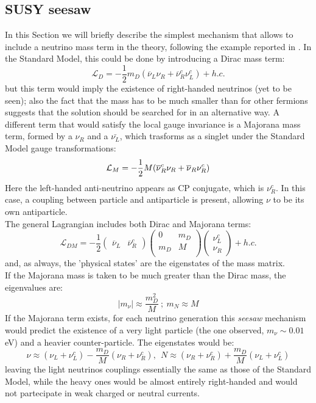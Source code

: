 \documentclass[12pt,a4paper,openright, oneside, titlepage]{book} %
\begin{document}
\subsection{SUSY seesaw}
In this Section we will briefly describe the simplest mechanism 
that allows to include a neutrino mass term in the theory, 
following the example reported in \cite{Thomson}. 
In the Standard Model, 
this could be done by introducing a Dirac mass term:
$$\mathcal{L}_D=-\frac{1}{2}m_D(\overline{\nu}_L\nu_R+\overline{\nu}_R^c\nu_L^c) + h.c.$$
but this term would imply the existence of right-handed neutrinos (yet to be seen); also the fact that the mass has to be much smaller than for other fermions suggests that the solution should be searched for in an alternative way.
A different term that would satisfy the local gauge invariance is a Majorana mass term, 
formed by a $\nu_R$ and a $\bar{\nu_L}$, which trasforms as a singlet under the Standard Model gauge transformations:
$$\mathcal{L}_M=-\frac{1}{2} M(\overline{\nu}\vphantom{\nu}_R^c\nu_R+\overline{\nu}_R\nu_R^c)$$
Here the left-handed anti-neutrino appears as CP conjugate, which is $\nu_R^c$.
In this case, a coupling between particle and antiparticle is present, allowing $\nu$ to be its own antiparticle.\\
The general Lagrangian includes both Dirac and Majorana terms:
$$\mathcal{L}_{DM}= -\frac{1}{2}
\begin{pmatrix} 
\overline{\nu}_L & \overline{\nu}_R^c 
\end{pmatrix}
\begin{pmatrix} 
0 & m_D\\
m_D & M\\
\end{pmatrix}
\begin{pmatrix} 
\nu_L^c\\
\nu_R
\end{pmatrix} + h.c.$$
and, as always, the 'physical states' are the eigenstates of the mass matrix.\\
If the Majorana mass is taken to be much greater than the Dirac mass, 
the eigenvalues are:
$$
|m_\nu|\approx \frac{m_D^2}{M}\ ;\ m_N\approx M
$$
If the Majorana term exists, for each neutrino generation
this \textit{seesaw} mechanism would predict the existence of a very light particle 
(the one observed, $m_\nu\sim0.01$ eV) and a heavier counter-particle.
The eigenstates would be:
$$
\nu\approx (\nu_L+\nu_L^c)-\frac{m_D}{M}(\nu_R+\nu_R^c),\ \
N\approx (\nu_R+\nu_R^c)+\frac{m_D}{M}(\nu_L+\nu_L^c)
$$
leaving the light neutrinos couplings essentially the same 
as those of the Standard Model, 
while the heavy ones would be almost entirely right-handed 
and would not partecipate in weak charged or neutral currents.
\end{document}
